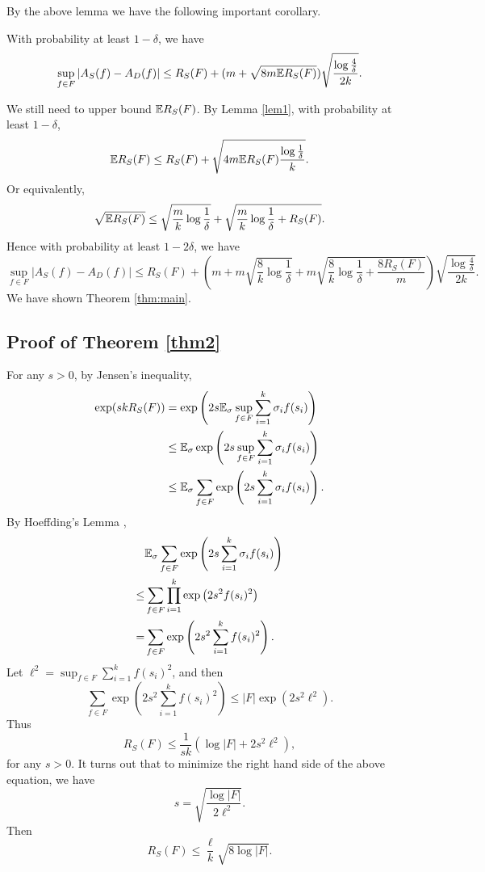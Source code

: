 By the above lemma we have the following important corollary.
\begin{corollary}
With probability at least $1-\delta$, we have
$$\sup_{f\in F}|A_S(f) - A_D(f)| \leq R_S(F) + (m+\sqrt{8m \mathbb{E} R_S(F)})\sqrt{\frac{\log \frac{4}{\delta}}{2k}}.$$
\end{corollary}

We still need to upper bound $\mathbb{E} R_S(F)$. By Lemma \ref{lem1}, with probability at least $1-\delta$,
$$\mathbb{E} R_S(F) \leq R_S(F) + \sqrt{4m\mathbb{E} R_S(F)\frac{\log \frac{1}{\delta}}{k}}.$$
Or equivalently,
$$\sqrt{\mathbb{E} R_S(F)} \leq \sqrt{\frac{m}{k}\log \frac{1}{\delta}} + \sqrt{\frac{m}{k}\log \frac{1}{\delta} + R_S(F)}.$$
Hence with probability at least $1-2\delta$, we have
$$\sup_{f\in F}|A_S(f) - A_D(f)| \leq R_S(F) + \left(m+m\sqrt{\frac{8}{k}\log \frac{1}{\delta}} + m\sqrt{\frac{8}{k}\log \frac{1}{\delta} + \frac{8R_S(F)}{m}}\right)\sqrt{\frac{\log \frac{4}{\delta}}{2k}}.$$
We have shown Theorem \ref{thm:main}.


\subsection{Proof of Theorem \ref{thm2}}
For any $s>0$, by Jensen's inequality,
$$\begin{aligned}
\exp(skR_S(F)) & = \exp\left(2s\mathbb{E}_\sigma \sup_{f\in F} \sum_{i=1}^k \sigma_i f(s_i)\right) \\
&\leq \mathbb{E}_\sigma \exp\left(2s \sup_{f\in F} \sum_{i=1}^k \sigma_i f(s_i)\right) \\
&\leq \mathbb{E}_\sigma \sum_{f\in F} \exp\left(2s\sum_{i=1}^k \sigma_i f(s_i)\right).
\end{aligned}$$
By Hoeffding's Lemma \cite{H63},
$$\begin{aligned}
&\mathbb{E}_\sigma \sum_{f\in F} \exp\left(2s\sum_{i=1}^k \sigma_i f(s_i)\right) \\
\leq & \sum_{f\in F}\prod_{i=1}^k \exp\left(2s^2f(s_i)^2\right) \\
=& \sum_{f\in F} \exp\left(2s^2\sum_{i=1}^k f(s_i)^2\right).
\end{aligned}$$
Let $\ell^2 = \sup_{f\in F}\sum_{i=1}^k f(s_i)^2$, and then
$$\sum_{f\in F} \exp\left(2s^2\sum_{i=1}^k f(s_i)^2\right) \leq |F| \exp\left(2s^2\ell^2\right).$$
Thus
$$R_S(F) \leq \frac{1}{sk}(\log|F| + 2s^2\ell^2),$$
for any $s>0$. It turns out that to minimize the right hand side of the above equation, we have
$$s = \sqrt{\frac{\log|F|}{2\ell^2}}.$$
Then
$$R_S(F) \leq \frac{\ell}{k}\sqrt{8\log |F|}.$$ 

